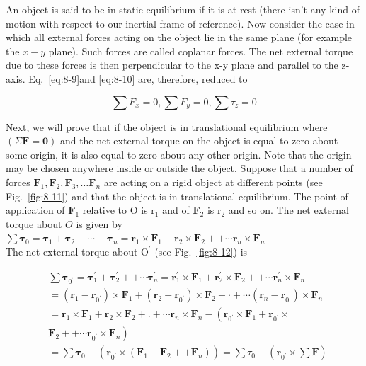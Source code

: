 \documentclass[10pt]{article}
\numberwithin{equation}{section}
\begin{document}
An object is said to be in static equilibrium if it is at rest (there isn't any kind of motion with respect to our inertial frame of reference). Now consider the case in which all external forces acting on the object lie in the same plane (for example the $x-y$ plane). Such forces are called coplanar forces. The net external torque due to these forces is then perpendicular to the x-y plane and parallel to the z-axis. Eq.~\eqref{eq:8-9}and \eqref{eq:8-10} are, therefore, reduced to

$$
\sum F_{x}=0, \sum F_{y}=0, \sum \tau_{z}=0
$$

Next, we will prove that if the object is in translational equilibrium where $(\Sigma \mathbf{F}=\mathbf{0})$ and the net external torque on the object is equal to zero about some origin, it is also equal to zero about any other origin. Note that the origin may be chosen anywhere inside or outside the object. Suppose that a number of forces $\mathbf{F}_{1}, \mathbf{F}_{2}, \mathbf{F}_{3}, \ldots \mathbf{F}_{n}$ are acting on a rigid object at different points (see Fig.~\ref{fig:8-11}) and that the object is in translational equilibrium. The point of application of $\mathbf{F}_{1}$ relative to O is $\mathrm{r}_{1}$ and of $\mathbf{F}_{2}$ is $\mathrm{r}_{2}$ and so on. The net external torque about $O$ is given by\\
$\sum \boldsymbol{\tau}_{0}=\boldsymbol{\tau}_{1}+\boldsymbol{\tau}_{2}+\cdots+\boldsymbol{\tau}_{n}=\mathbf{r}_{1} \times \mathbf{F}_{1}+\mathbf{r}_{2} \times \mathbf{F}_{2}++\cdots \mathbf{r}_{n} \times \mathbf{F}_{n}$\\
The net external torque about $\mathrm{O}^{\prime}$ (see Fig.~\ref{fig:8-12}) is

$$
\begin{aligned}
& \sum \boldsymbol{\tau}_{0^{\prime}}=\boldsymbol{\tau}_{1}^{\prime}+\boldsymbol{\tau}_{2}^{\prime}++\cdots \boldsymbol{\tau}_{n}^{\prime}=\mathbf{r}_{1}^{\prime} \times \mathbf{F}_{1}+\mathbf{r}_{2}^{\prime} \times \mathbf{F}_{2}++\cdots \mathbf{r}_{n}^{\prime} \times \mathbf{F}_{n} \\
& =\left(\mathbf{r}_{1}-\mathbf{r}_{0^{\prime}}\right) \times \mathbf{F}_{1}+\left(\mathbf{r}_{2}-\mathbf{r}_{0^{\prime}}\right) \times \mathbf{F}_{2}+\cdot+\cdots\left(\mathbf{r}_{n}-\mathbf{r}_{0^{\prime}}\right) \times \mathbf{F}_{n} \\
& =\mathbf{r}_{1} \times \mathbf{F}_{1}+\mathbf{r}_{2} \times \mathbf{F}_{2}+.+\cdots \mathbf{r}_{n} \times \mathbf{F}_{n}-\left(\mathbf{r}_{0^{\prime}} \times \mathbf{F}_{1}+\mathbf{r}_{0^{\prime}} \times\right. \\
& \left.\mathbf{F}_{2}++\cdots \mathbf{r}_{0^{\prime}} \times \mathbf{F}_{n}\right) \\
& =\sum \boldsymbol{\tau}_{0}-\left(\mathbf{r}_{0^{\prime}} \times\left(\mathbf{F}_{1}+\mathbf{F}_{2}++\mathbf{F}_{n}\right)\right)=\sum \tau_{0}-\left(\mathbf{r}_{0^{\prime}} \times \sum \mathbf{F}\right)
\end{aligned}
$$
\end{document}
